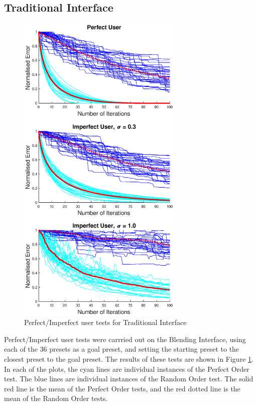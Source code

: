 \documentclass[11pt, oneside]{report}   	%
\begin{document}
\subsection{Traditional Interface}\label{sec:TradEval}
\begin{figure}
	\centering
	\vspace{-110pt}
	\includegraphics[trim  ={0, 2.3cm, 0, 1.5cm}, clip, width = 3.1in]{TradInterfaceTests1.eps}
	\caption{Perfect/Imperfect user tests for Traditional Interface}
	\label{fig:TradTest1}
	
	
	\vspace{-40pt}
	
\end{figure}
Perfect/Imperfect user tests were carrried out on the Blending Interface, using each of the 36 presets as a goal preset, and setting the starting preset to the closest preset to the goal preset. The results of these tests are shown in Figure \ref{fig:TradTest1}. In each of the plots, the cyan lines are individual instances of the Perfect Order test. The blue lines are individual instances of the Random Order test. The solid red line is the mean of the Perfect Order tests, and the red dotted line is the mean of the Random Order tests. 
\end{document}
